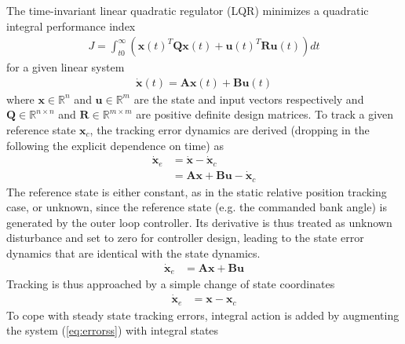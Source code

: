 \documentclass{ifacconf}
\newcommand{\mbf}[1]{\mathbf{#1}}
\providecommand{\mbf}[1]{\mathbf{#1}}
\begin{document}
\noindent
The time-invariant linear quadratic regulator (LQR) minimizes a quadratic integral performance index
\begin{align}
J = \int_{t0}^{\infty}(
\mathbf{x}(t)^T 
\mathbf{Q}
\mathbf{x}(t)
+
\mathbf{u}(t)^T 
\mathbf{R}
\mathbf{u}(t)
)
dt
\end{align}
for a given linear system
\begin{align}
\dot{\mathbf{x}}(t)
=
\mathbf{A}
\mathbf{x}(t)
+
\mathbf{B}
\mathbf{u}(t)
\end{align}
where $\mathbf{x} \in \mathbb{R}^n$ and $\mathbf{u} \in \mathbb{R}^m$ are the state and input vectors respectively and $\mathbf{Q} \in \mathbb{R}^{n\times n}$ and $\mathbf{R} \in \mathbb{R}^{m\times m}$ are positive definite design matrices.
To track a given reference state $\mbf{x}_c$, the tracking error dynamics are derived (dropping in the following the explicit dependence on time) as
\begin{align}
\dot{\mathbf{x}}_e
&=
\dot{\mbf{x}}
-
\dot{\mathbf{x}}_c \\
{}
&=
\mathbf{A}
\mathbf{x}
+
\mathbf{B}
\mathbf{u}
-
\dot{\mathbf{x}}_c 
\end{align}
The reference state is either constant, as in the static relative position tracking case, or unknown, since the reference state (e.g. the commanded bank angle) is generated by the outer loop controller. Its derivative is thus treated as unknown disturbance and set to zero for controller design, leading to the state error dynamics
that are identical with the state dynamics. 
\begin{align}
\dot{\mathbf{x}}_e
&=
\mathbf{A}
\mathbf{x}
+
\mathbf{B}
\mbf{u}
\end{align}
Tracking is thus approached by a simple change of state coordinates
\begin{align}
\dot{\mbf{x}}_e
&=
{\mbf{x}}
-
{\mbf{x}}_c 
\label{eq:errorss}
\end{align}
To cope with steady state tracking errors, integral action is added by augmenting the system (\ref{eq:errorss}) with integral states
\end{document}
